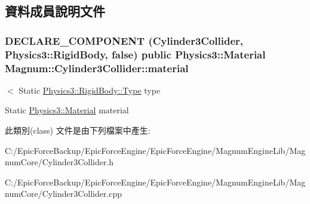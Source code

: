 \subsection{資料成員說明文件}
\subsubsection[{\texorpdfstring{material}{material}}]{\setlength{\rightskip}{0pt plus 5cm}D\+E\+C\+L\+A\+R\+E\+\_\+\+C\+O\+M\+P\+O\+N\+E\+NT ({\bf Cylinder3\+Collider}, {\bf Physics3\+::\+Rigid\+Body}, false) public {\bf Physics3\+::\+Material} Magnum\+::\+Cylinder3\+Collider\+::material}\hypertarget{class_magnum_1_1_cylinder3_collider_a9ae56c2146bdab47ca13a408e62509e0}{}\label{class_magnum_1_1_cylinder3_collider_a9ae56c2146bdab47ca13a408e62509e0}


$<$ Static \hyperlink{class_magnum_1_1_physics3_1_1_rigid_body_a429aa4fb7256b083334c86cdcd0d6b31}{Physics3\+::\+Rigid\+Body\+::\+Type} type 

Static \hyperlink{class_magnum_1_1_physics3_1_1_material}{Physics3\+::\+Material} material 

此類別(class) 文件是由下列檔案中產生\+:\begin{DoxyCompactItemize}
\item 
C\+:/\+Epic\+Force\+Backup/\+Epic\+Force\+Engine/\+Epic\+Force\+Engine/\+Magnum\+Engine\+Lib/\+Magnum\+Core/Cylinder3\+Collider.\+h\item 
C\+:/\+Epic\+Force\+Backup/\+Epic\+Force\+Engine/\+Epic\+Force\+Engine/\+Magnum\+Engine\+Lib/\+Magnum\+Core/Cylinder3\+Collider.\+cpp\end{DoxyCompactItemize}
